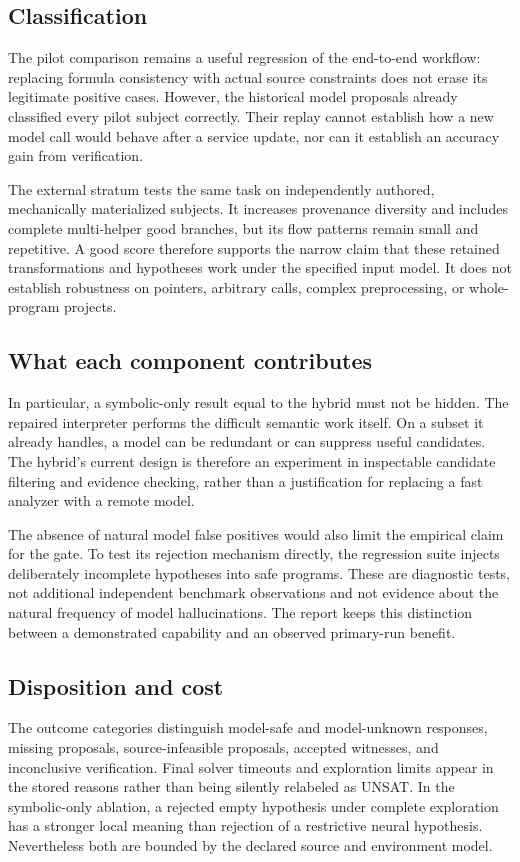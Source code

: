 \documentclass[sigconf]{acmart}
\begin{document}
\subsection{Classification}
\ResultsDiscussion{}
The pilot comparison remains a useful regression of the end-to-end workflow:
replacing formula consistency with actual source constraints does not erase
its legitimate positive cases. However, the historical model proposals already
classified every pilot subject correctly. Their replay cannot establish how a
new model call would behave after a service update, nor can it establish an
accuracy gain from verification.

The external stratum tests the same task on independently authored, mechanically
materialized subjects. It increases provenance diversity and includes complete
multi-helper good branches, but its flow patterns remain small and repetitive.
A good score therefore supports the narrow claim that these retained
transformations and hypotheses work under the specified input model. It does
not establish robustness on pointers, arbitrary calls, complex preprocessing,
or whole-program projects.

\subsection{What each component contributes}
\AblationDiscussion{}
In particular, a symbolic-only result equal to the hybrid must not be hidden.
The repaired interpreter performs the difficult semantic work itself. On a
subset it already handles, a model can be redundant or can suppress useful
candidates. The hybrid's current design is therefore an experiment in
inspectable candidate filtering and evidence checking, rather than a
justification for replacing a fast analyzer with a remote model.

The absence of natural model false positives would also limit the empirical
claim for the gate. To test its rejection mechanism directly, the regression
suite injects deliberately incomplete hypotheses into safe programs. These
are diagnostic tests, not additional independent benchmark observations and
not evidence about the natural frequency of model hallucinations. The report
keeps this distinction between a demonstrated capability and an observed
primary-run benefit.

\subsection{Disposition and cost}
\DispositionDiscussion{}
The outcome categories distinguish model-safe and model-unknown responses,
missing proposals, source-infeasible proposals, accepted witnesses, and
inconclusive verification. Final solver timeouts and exploration limits appear
in the stored reasons rather than being silently relabeled as UNSAT. In the
symbolic-only ablation, a rejected empty hypothesis under complete exploration
has a stronger local meaning than rejection of a restrictive neural hypothesis.
Nevertheless both are bounded by the declared source and environment model.
\end{document}
